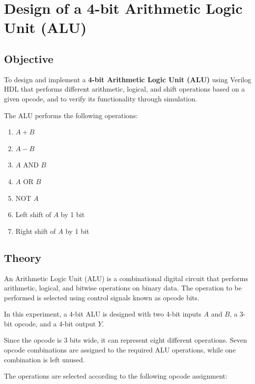 \documentclass[12pt,a4paper]{report}
\begin{document}
\vspace{2.5cm}

\chapter{Design of a 4-bit Arithmetic Logic Unit (ALU)}
\label{ch:pdf15}

\section{Objective}

To design and implement a \textbf{4-bit Arithmetic Logic Unit (ALU)} using Verilog HDL that performs different arithmetic, logical, and shift operations based on a given opcode, and to verify its functionality through simulation.

The ALU performs the following operations:

\begin{enumerate}
    \item $A + B$
    \item $A - B$
    \item $A$ AND $B$
    \item $A$ OR $B$
    \item NOT $A$
    \item Left shift of $A$ by 1 bit
    \item Right shift of $A$ by 1 bit
\end{enumerate}

\section{Theory}

An Arithmetic Logic Unit (ALU) is a combinational digital circuit that performs arithmetic, logical, and bitwise operations on binary data. The operation to be performed is selected using control signals known as opcode bits.

In this experiment, a 4-bit ALU is designed with two 4-bit inputs $A$ and $B$, a 3-bit opcode, and a 4-bit output $Y$.

Since the opcode is 3 bits wide, it can represent eight different operations. Seven opcode combinations are assigned to the required ALU operations, while one combination is left unused.

The operations are selected according to the following opcode assignment:
\end{document}
